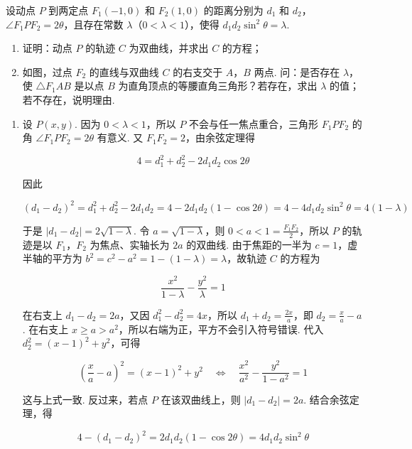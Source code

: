 \begin{problem}
设动点 \(P\) 到两定点 \(F_{1}(-1,0)\) 和 \(F_{2}(1,0)\) 的距离分别为 \(d_{1}\) 和 \(d_{2}\)，\(\angle F_{1}PF_{2} = 2\theta\)，且存在常数 \(\lambda\)（\(0 < \lambda < 1\)），使得 \(d_{1}d_{2}\sin^{2}\theta = \lambda\).

\begin{enumerate}
\item 证明：动点 \(P\) 的轨迹 \(C\) 为双曲线，并求出 \(C\) 的方程；
\item 如图，过点 \(F_{2}\) 的直线与双曲线 \(C\) 的右支交于 \(A\)，\(B\) 两点. 问：是否存在 \(\lambda\)，使 \(\triangle F_{1}AB\) 是以点 \(B\) 为直角顶点的等腰直角三角形？若存在，求出 \(\lambda\) 的值；若不存在，说明理由.
\end{enumerate}


\begin{solution}
\begin{enumerate}
\item 设 \(P(x,y)\). 因为 \(0<\lambda<1\)，所以 \(P\) 不会与任一焦点重合，三角形 \(F_1PF_2\) 的角 \(\angle F_1PF_2=2\theta\) 有意义. 又 \(F_1F_2=2\)，由余弦定理得

\[
4=d_1^2+d_2^2-2d_1d_2\cos 2\theta
\]

因此

\[
(d_1-d_2)^2=d_1^2+d_2^2-2d_1d_2=4-2d_1d_2(1-\cos2\theta)=4-4d_1d_2\sin^2\theta=4(1-\lambda)
\]

于是 \(|d_1-d_2|=2\sqrt{1-\lambda}\). 令 \(a=\sqrt{1-\lambda}\)，则 \(0<a<1=\frac{F_1F_2}{2}\)，所以 \(P\) 的轨迹是以 \(F_1\)，\(F_2\) 为焦点、实轴长为 \(2a\) 的双曲线. 由于焦距的一半为 \(c=1\)，虚半轴的平方为 \(b^2=c^2-a^2=1-(1-\lambda)=\lambda\)，故轨迹 \(C\) 的方程为

\[
\frac{x^2}{1-\lambda}-\frac{y^2}{\lambda}=1
\]

在右支上 \(d_1-d_2=2a\)，又因 \(d_1^2-d_2^2=4x\)，所以 \(d_1+d_2=\frac{2x}{a}\)，即 \(d_2=\frac{x}{a}-a\). 在右支上 \(x\geqslant a>a^2\)，所以右端为正，平方不会引入符号错误. 代入 \(d_2^2=(x-1)^2+y^2\)，可得

\[
\left(\frac{x}{a}-a\right)^2=(x-1)^2+y^2
\quad\Longleftrightarrow\quad
\frac{x^2}{a^2}-\frac{y^2}{1-a^2}=1
\]

这与上式一致. 反过来，若点 \(P\) 在该双曲线上，则 \(\lvert d_1-d_2\rvert=2a\). 结合余弦定理，得

\[
4-(d_1-d_2)^2=2d_1d_2(1-\cos 2\theta)=4d_1d_2\sin^2\theta
\]


\end{enumerate}
\end{solution}
\end{problem}
